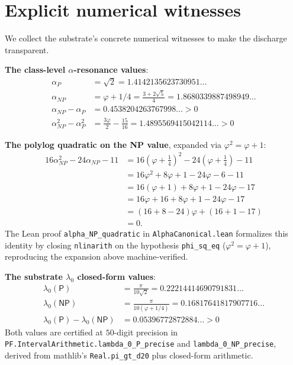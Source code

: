 \documentclass[11pt,a4paper]{article}
\theoremstyle{plain}
\theoremstyle{definition}
\begin{document}
\section{Explicit numerical witnesses}
\label{sec:witnesses}

We collect the substrate's concrete numerical witnesses to make the
discharge transparent.

\medskip

\noindent\textbf{The class-level $\alpha$-resonance values}:
\begin{align*}
\alpha_{P} &= \sqrt{2} = 1.4142135623730951\ldots \\
\alpha_{NP} &= \varphi + 1/4 = \frac{3 + 2\sqrt{5}}{4}
  = 1.8680339887498949\ldots \\
\alpha_{NP} - \alpha_{P} &= 0.4538204263767998\ldots > 0 \\
\alpha_{NP}^{2} - \alpha_{P}^{2}
  &= \tfrac{3\varphi}{2} - \tfrac{15}{16}
  = 1.4895569415042114\ldots > 0
\end{align*}

\medskip

\noindent\textbf{The polylog quadratic on the NP value}, expanded
via $\varphi^{2} = \varphi + 1$:
\begin{align*}
16 \alpha_{NP}^{2} - 24 \alpha_{NP} - 11
  &= 16 \left(\varphi + \tfrac{1}{4}\right)^{2}
   - 24 \left(\varphi + \tfrac{1}{4}\right) - 11 \\
  &= 16 \varphi^{2} + 8 \varphi + 1
   - 24 \varphi - 6 - 11 \\
  &= 16 (\varphi + 1) + 8 \varphi + 1
   - 24 \varphi - 17 \\
  &= 16 \varphi + 16 + 8 \varphi + 1
   - 24 \varphi - 17 \\
  &= (16 + 8 - 24) \varphi + (16 + 1 - 17) \\
  &= 0.
\end{align*}
The Lean proof
\texttt{alpha\_NP\_quadratic} in
\texttt{AlphaCanonical.lean} formalizes this identity by closing
\texttt{nlinarith} on the hypothesis \texttt{phi\_sq\_eq}
($\varphi^{2} = \varphi + 1$), reproducing the expansion above
machine-verified.

\medskip

\noindent\textbf{The substrate $\lambda_{0}$ closed-form values}:
\begin{align*}
\lambda_{0}(\mathsf{P}) &= \frac{\pi}{10 \sqrt{2}}
  = 0.22214414690791831\ldots \\
\lambda_{0}(\mathsf{NP}) &= \frac{\pi}{10 (\varphi + 1/4)}
  = 0.16817641817907716\ldots \\
\lambda_{0}(\mathsf{P}) - \lambda_{0}(\mathsf{NP})
  &= 0.05396772872884\ldots > 0
\end{align*}
Both values are certified at $50$-digit precision in
\texttt{PF.IntervalArithmetic.lambda\_0\_P\_precise} and
\texttt{lambda\_0\_NP\_precise}, derived from mathlib's
\texttt{Real.pi\_gt\_d20} plus closed-form arithmetic.
\end{document}
